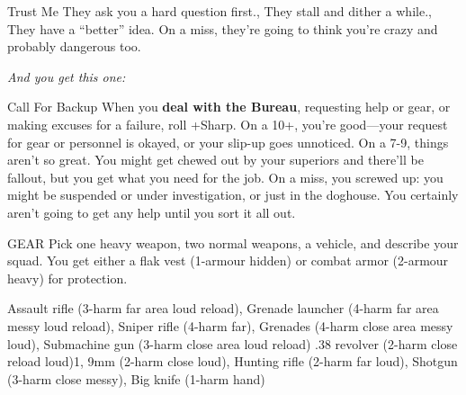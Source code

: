 {\begin{move}{Trust Me}
\holdoptions%
    {They ask you a hard question first.,
    They stall and dither a while.,
    They have a “better” idea.}%
    On a miss, they’re going to think you’re crazy and probably dangerous too.
\end{move}
%
}{%
%
\textit{And you get this one:}\\
%
\begin{move*}{Call For Backup}
When you \textbf{deal with the Bureau}, requesting help or gear, or making excuses for a failure, roll +Sharp. On a 10+, you’re good—your request for gear or personnel is okayed, or your slip-up goes unnoticed. On a 7-9, things aren’t so great. You might get chewed out by your superiors and there’ll be fallout, but you get what you need for the job. On a miss, you screwed up: you might be suspended or under investigation, or just in the doghouse. You certainly aren’t going to get any help until you sort it all out.
\end{move*}
%
\begin{pbsect}{GEAR}
Pick one heavy weapon, two normal weapons, a vehicle, and describe your squad.  You get either a flak vest (1-armour hidden) or combat armor (2-armour heavy) for protection.
\end{pbsect}
\br[2mm]
%
%
    {Assault rifle (3-harm far area loud reload),
    Grenade launcher (4-harm far area messy loud reload),
    Sniper rifle (4-harm far),
    Grenades (4-harm close area messy loud),
    Submachine gun (3-harm close area loud reload)}
\brln
%
%
    {.38 revolver (2-harm close reload loud)1,
    9mm (2-harm close loud),
    Hunting rifle (2-harm far loud),
    Shotgun (3-harm close messy),
    Big knife (1-harm hand)}%
%
}\pagebreak%
%
